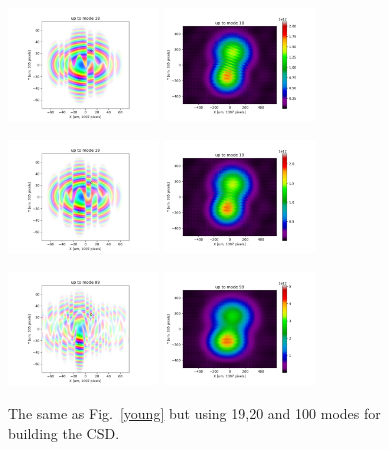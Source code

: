\documentclass{iucr}              %
\begin{document}
\begin{figure}
\caption{The same as Fig.~\ref{young} but using 19,20 and 100 modes for building the CSD.}


\includegraphics[width=4cm]{Figures/interference_D_uptomode0018_csd.png}
\includegraphics[width=4cm]{Figures/interference_D_uptomode0018_pattern.png}

\includegraphics[width=4cm]{Figures/interference_D_uptomode0019_csd.png}
\includegraphics[width=4cm]{Figures/interference_D_uptomode0019_pattern.png}

\includegraphics[width=4cm]{Figures/interference_D_uptomode0099_csd.png}
\includegraphics[width=4cm]{Figures/interference_D_uptomode0099_pattern.png}

\label{young2}
\end{figure}
\end{document}

